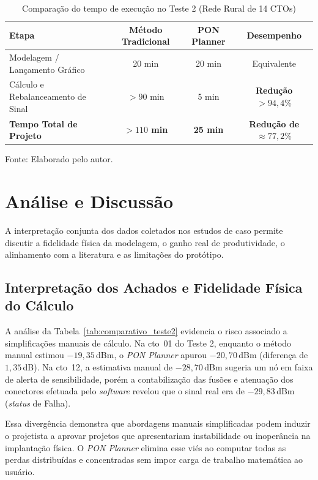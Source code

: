 \begin{table}[htb]
\centering
\caption{Comparação do tempo de execução no Teste 2 (Rede Rural de 14 CTOs)}
\label{tab:tempo_teste2}
\begin{tabularx}{\textwidth}{X c c c}
\hline
\textbf{Etapa} & \textbf{Método Tradicional} & \textbf{PON Planner} & \textbf{Desempenho} \\
\hline
Modelagem / Lançamento Gráfico & 20 min & 20 min & Equivalente \\
Cálculo e Rebalanceamento de Sinal & $> 90$ min & 5 min & \textbf{Redução $> 94,4\%$} \\
\hline
\textbf{Tempo Total de Projeto} & \textbf{$> 110$ min} & \textbf{25 min} & \textbf{Redução de $\approx 77,2\%$} \\
\hline
\end{tabularx}
\par\footnotesize Fonte: Elaborado pelo autor.
\end{table}

\section{Análise e Discussão}
\label{sec:analise_discussao}

A interpretação conjunta dos dados coletados nos estudos de caso permite discutir a fidelidade física da modelagem, o ganho real de produtividade, o alinhamento com a literatura e as limitações do protótipo.

\subsection{Interpretação dos Achados e Fidelidade Física do Cálculo}

A análise da Tabela~\ref{tab:comparativo_teste2} evidencia o risco associado a simplificações manuais de cálculo. Na \gls{cto}~01 do Teste 2, enquanto o método manual estimou $-19{,}35$\,dBm, o \textit{PON Planner} apurou $-20{,}70$\,dBm (diferença de $1{,}35$\,dB). Na \gls{cto}~12, a estimativa manual de $-28{,}70$\,dBm sugeria um nó em faixa de alerta de sensibilidade, porém a contabilização das fusões e atenuação dos conectores efetuada pelo \textit{software} revelou que o sinal real era de $-29{,}83$\,dBm (\textit{status} de Falha).

Essa divergência demonstra que abordagens manuais simplificadas podem induzir o projetista a aprovar projetos que apresentariam instabilidade ou inoperância na implantação física. O \textit{PON Planner} elimina esse viés ao computar todas as perdas distribuídas e concentradas sem impor carga de trabalho matemática ao usuário.

